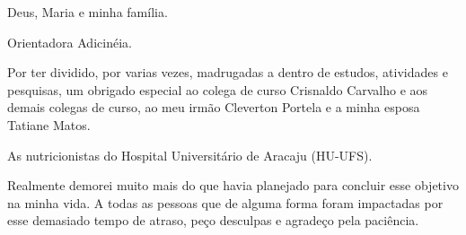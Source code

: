 \begin{agradecimentos}

Deus, Maria e minha família.

Orientadora Adicinéia.

Por ter dividido, por varias vezes, madrugadas a dentro de estudos, atividades e pesquisas, um obrigado especial ao colega de curso Crisnaldo Carvalho e aos demais colegas de curso, ao meu irmão Cleverton Portela e a minha esposa Tatiane Matos. 

As nutricionistas do Hospital Universitário de Aracaju (HU-UFS).

Realmente demorei muito mais do que havia planejado para concluir esse objetivo na minha vida. A todas as pessoas que de alguma forma foram impactadas por esse demasiado tempo de atraso, peço desculpas e agradeço pela paciência. 


\end{agradecimentos}
